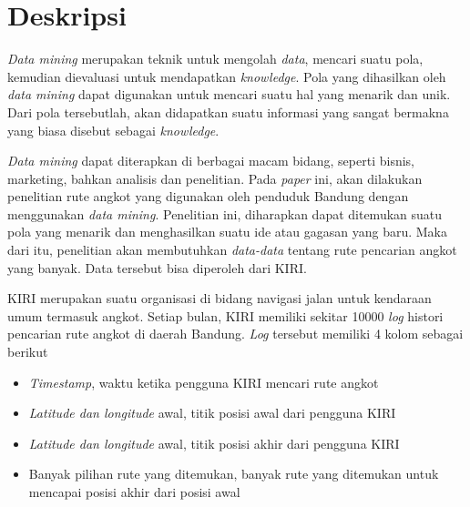 \documentclass[a4paper,twoside]{article}
\begin{document}
\title{\@judultopik}
\author{\nama \textendash \@npm} 

\newcommand{\nama}{Jovan Gunawan}
\newcommand{\@npm}{2011730029}
\newcommand{\@judultopik}{\textsl{Data Mining} Histori Pencarian Rute Angkot} %
\newcommand{\jumpemb}{1} %
\newcommand{\tanggal}{7/06/2014}
\maketitle


\section{Deskripsi}
\textsl{Data mining} merupakan teknik untuk mengolah \textsl{data}, mencari suatu pola, kemudian dievaluasi untuk mendapatkan \textsl{knowledge}. Pola yang dihasilkan oleh \textsl{data mining} dapat digunakan untuk mencari suatu hal yang menarik dan unik. Dari pola tersebutlah, akan didapatkan suatu informasi yang sangat bermakna yang biasa disebut sebagai \textsl{knowledge}.

\textsl{Data mining} dapat diterapkan di berbagai macam bidang, seperti bisnis, marketing, bahkan analisis dan penelitian. Pada \textsl{paper} ini, akan dilakukan penelitian rute angkot yang digunakan oleh penduduk Bandung dengan menggunakan \textsl{data mining}. Penelitian ini, diharapkan dapat ditemukan suatu pola yang menarik dan menghasilkan suatu ide atau gagasan yang baru. Maka dari itu, penelitian akan membutuhkan \textsl{data-data} tentang rute pencarian angkot yang banyak. Data tersebut bisa diperoleh dari KIRI.

KIRI merupakan suatu organisasi di bidang navigasi jalan untuk kendaraan umum termasuk angkot. Setiap bulan, KIRI memiliki sekitar 10000 \textsl{log} histori pencarian rute angkot di daerah Bandung. \textsl{Log} tersebut memiliki 4 kolom sebagai berikut
\begin{itemize}
	\item \textsl{Timestamp}, waktu ketika pengguna KIRI mencari rute angkot
	\item \textsl{Latitude dan longitude} awal, titik posisi awal dari pengguna KIRI
	\item \textsl{Latitude dan longitude} awal, titik posisi akhir dari pengguna KIRI
	\item Banyak pilihan rute yang ditemukan, banyak rute yang ditemukan untuk mencapai posisi akhir dari posisi awal
\end{itemize}
\end{document}
